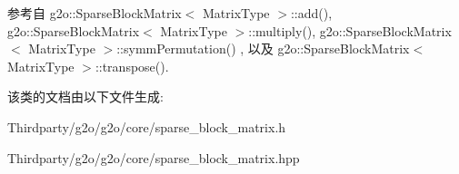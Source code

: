参考自 g2o\-::\-Sparse\-Block\-Matrix$<$ Matrix\-Type $>$\-::add(), g2o\-::\-Sparse\-Block\-Matrix$<$ Matrix\-Type $>$\-::multiply(), g2o\-::\-Sparse\-Block\-Matrix$<$ Matrix\-Type $>$\-::symm\-Permutation() , 以及 g2o\-::\-Sparse\-Block\-Matrix$<$ Matrix\-Type $>$\-::transpose().



该类的文档由以下文件生成\-:\begin{DoxyCompactItemize}
\item 
Thirdparty/g2o/g2o/core/sparse\-\_\-block\-\_\-matrix.\-h\item 
Thirdparty/g2o/g2o/core/sparse\-\_\-block\-\_\-matrix.\-hpp\end{DoxyCompactItemize}

